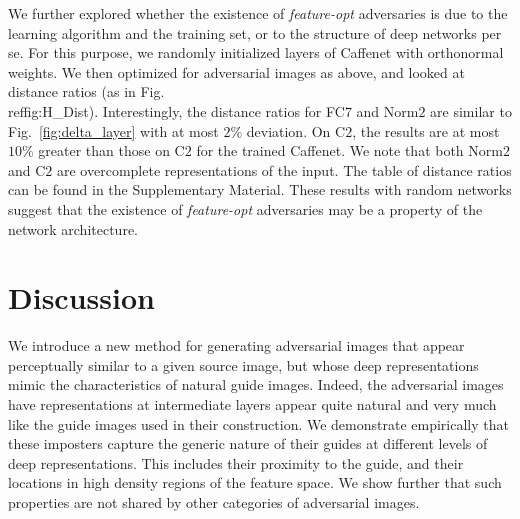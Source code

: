 \documentclass{article} %
\newcommand{\comment}[1]{}
\begin{document}
We further explored whether the existence of {\em feature-opt} adversaries
is due to the learning algorithm and the training set, or to the structure
of deep networks per se. For this purpose, we randomly initialized layers of
Caffenet with orthonormal weights.  We then optimized for adversarial images
as above, and looked at distance ratios (as in Fig.\\ref{fig:H_Dist}).
Interestingly, the distance ratios for FC$7$ and Norm$2$ are similar to
Fig.~\ref{fig:delta_layer} with at most $2\%$ deviation.  On C$2$, the results
are at most $10\%$ greater than those on C$2$ for the trained Caffenet.
We note that both Norm$2$ and C$2$ are overcomplete representations
of the input. The table of distance ratios can be found in the
Supplementary Material.
These results with random networks suggest that the existence of
{\em feature-opt} adversaries may be a property of the network architecture.

\comment{This observation shows that the model itself is vulnerable to {\em
feature-opt} adversaries, rather than just a specific trained network.}%
\section{Discussion}\vspace*{-0.1cm}

We introduce a new method for generating adversarial images that appear
perceptually similar to a given source image, but whose deep representations
mimic the characteristics of natural guide images.
Indeed, the adversarial images have representations at intermediate
layers appear quite natural and very much like the guide images used
in their construction.
We demonstrate empirically that these imposters capture the generic
nature of their guides at different levels of deep representations.  This
includes their proximity to the guide, and their locations in high density
regions of the feature space.
We show further that such properties are not shared by other
categories of adversarial images.
\end{document}
